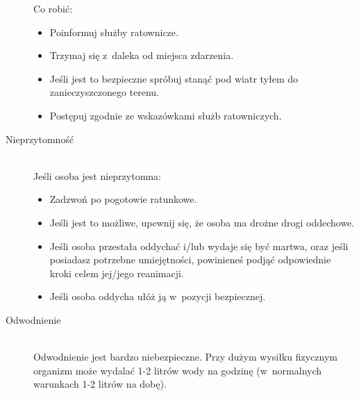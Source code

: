 \documentclass[a5paper,10pt,titlepage,twoside]{article}
\begin{document}
\begin{description}
Co robić:
\begin{itemize}
\item Poinformuj służby ratownicze.
\item Trzymaj się z~daleka od miejsca zdarzenia.
\item Jeśli jest to bezpieczne spróbuj stanąć pod wiatr tyłem do zanieczyszczonego terenu.
\item Postępuj zgodnie ze wskazówkami służb ratowniczych.
\end{itemize}
\item[Nieprzytomność] \hfill \\ Jeśli osoba jest nieprzytomna:
\begin{itemize}
\item Zadzwoń po pogotowie ratunkowe.
\item Jeśli jest to możliwe, upewnij się, że osoba ma drożne drogi oddechowe.
\item Jeśli osoba przestała oddychać i/lub wydaje się być martwa, oraz jeśli posiadasz potrzebne umiejętności, powinieneś podjąć odpowiednie kroki celem jej/jego reanimacji.
\item Jeśli osoba oddycha ułóż ją w~pozycji bezpiecznej.
\end{itemize}
\item[Odwodnienie] \hfill \\ Odwodnienie jest bardzo niebezpieczne. Przy dużym wysiłku fizycznym organizm może wydalać 1-2 litrów wody na godzinę (w~normalnych warunkach 1-2 litrów na dobę).


\end{description}
\end{document}
